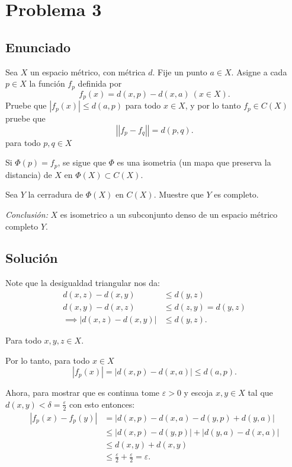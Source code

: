 \documentclass{report}
\begin{document}
\chapter{Problema 3}
\section{Enunciado}

Sea $X$ un espacio métrico, con métrica $d$. Fije un punto $a \in X$. Asigne a cada $p \in X$ la función $f_p$ definida por \[
f_p\left( x \right) = d\left( x, p \right) - d\left( x, a \right)\ \left( x \in X \right) 
.\] Pruebe que $\left| f_p\left( x \right)  \right| \le d\left( a, p \right) $ para todo $x \in X$, y por lo tanto $f_p \in C\left( X \right) $ pruebe que \[
\left| \left| f_p - f_q \right|  \right| = d\left( p, q \right) 
.\] para todo $p, q \in X$

Si $\Phi\left( p \right) = f_p$, se sigue que $\Phi$ es una isometria (un mapa que preserva la distancia) de $X$ en $\Phi\left( X \right) \subset C\left( X \right) $.

Sea $Y$ la cerradura de $\Phi\left( X \right) $ en $C\left( X \right)$. Muestre que $Y$ es completo.

\textit{Conclusión:} $X$ es isometrico a un subconjunto denso de un espacio métrico completo $Y$. 

\section{Solución}

Note que la desigualdad triangular nos da:
\begin{align*}
  d\left( x, z \right) - d\left( x, y \right) &\le d\left( y, z \right) \\
  d\left( x, y \right) - d\left( x, z \right) &\le d\left( z, y \right) = d\left( y, z \right) \\
  \implies \left| d\left( x, z \right)  - d\left( x, y \right)  \right| &\le d\left( y, z \right) 
.\end{align*}

Para todo $x, y, z \in X$.

Por lo tanto, para todo $x \in X$ \[
\left| f_p\left( x \right)  \right|  = \left| d\left( x, p \right) - d\left( x, a \right)  \right| \le d\left( a, p \right) 
.\]

Ahora, para mostrar que es continua tome $\varepsilon > 0$ y escoja $x, y \in X$ tal que $d\left( x, y \right) < \delta = \frac{\varepsilon}{2}$ con esto entonces:
\begin{align*}
  \left| f_p\left( x \right) - f_p\left( y \right)  \right| &= \left| d\left( x, p \right) - d\left( x, a \right) - d\left( y, p \right) + d\left( y, a \right)  \right|  \\
							    &\le \left| d\left( x, p \right) - d\left( y, p \right)  \right| + \left| d\left( y, a \right) - d\left( x, a \right)  \right| \\
							    &\le d\left( x,y \right) + d\left( x, y \right) \\
							    &\le \frac{\varepsilon}{2} + \frac{\varepsilon}{2} = \varepsilon
.\end{align*}
\end{document}
